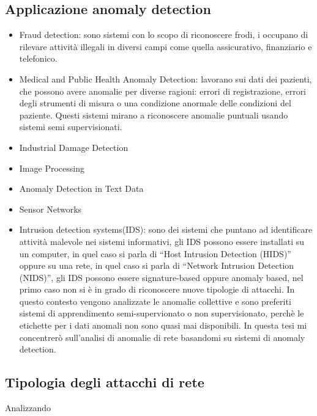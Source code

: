 \subsection{Applicazione anomaly detection}
\begin{itemize}
    \item Fraud detection: sono sistemi con lo scopo di riconoscere frodi, i occupano di rilevare attività illegali in diversi campi come quella assicurativo, finanziario e telefonico.
    \item Medical and Public Health Anomaly Detection: lavorano sui dati dei pazienti, che possono avere anomalie per diverse ragioni: errori di registrazione, errori degli strumenti di misura o una condizione anormale delle condizioni del paziente. Questi sistemi mirano a riconoscere anomalie puntuali usando sistemi semi supervisionati.
    \item Industrial Damage Detection
    \item Image Processing
    \item Anomaly Detection in Text Data
    \item Sensor Networks
    \item Intrusion detection systems(IDS): sono dei sistemi che puntano ad identificare attività malevole nei sistemi informativi, gli IDS possono essere installati su un computer, in quel caso si parla di ``Host Intrusion Detection (HIDS)'' oppure su una rete, in quel caso si parla di ``Network Intrusion Detection (NIDS)'', gli IDS possono essere signature-based oppure anomaly based, nel primo caso non si è in grado di riconoscere nuove tipologie di attacchi. In questo contesto vengono analizzate le anomalie collettive e sono preferiti sistemi di apprendimento semi-supervionato o non supervisionato, perchè le etichette per i dati anomali non sono quasi mai disponibili. In questa tesi mi concentrerò sull'analisi di anomalie di rete basandomi su sistemi di anomaly detection. 
\end{itemize}

\subsection{Tipologia degli attacchi di rete}
Analizzando 

